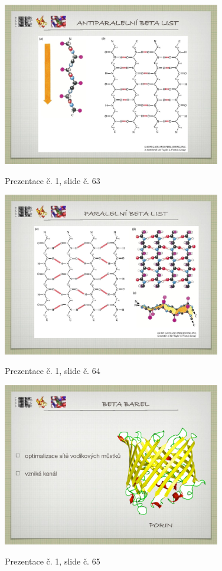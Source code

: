 \documentclass[DIV=8]{scrreprt}
\begin{document}
\begin{figure}
    \caption{Prezentace č. 1, slide č. 63}
    \includegraphics[width=0.85\textwidth]{slides-1/slide-63.jpg}
    \centering
    \label{slides-1-slide-63}
\end{figure}
\begin{figure}
    \caption{Prezentace č. 1, slide č. 64}
    \includegraphics[width=0.85\textwidth]{slides-1/slide-64.jpg}
    \centering
    \label{slides-1-slide-64}
\end{figure}
\begin{figure}
    \caption{Prezentace č. 1, slide č. 65}
    \includegraphics[width=0.85\textwidth]{slides-1/slide-65.jpg}
    \centering
    \label{slides-1-slide-65}
\end{figure}
\end{document}
